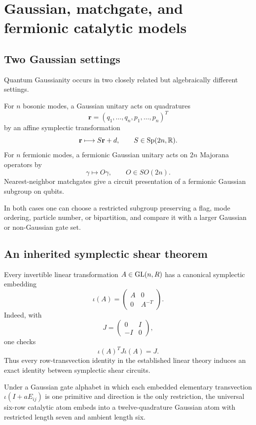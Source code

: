 \chapter{Gaussian, matchgate, and fermionic catalytic models}\label{ch:gaussian}


\section{Two Gaussian settings}
Quantum Gaussianity occurs \cite{WeedbrookEtAl2012} in two closely related but algebraically different settings.

For $n$ bosonic modes, a Gaussian unitary acts on quadratures
\[
\mathbf r=(q_1,\ldots,q_n,p_1,\ldots,p_n)^T
\]
by an affine symplectic transformation
\[
\mathbf r\longmapsto S\mathbf r+d,
\qquad
S\in\operatorname{Sp}(2n,\mathbb R).
\]
For $n$ fermionic modes, a fermionic Gaussian unitary acts on $2n$ Majorana operators by
\[
\gamma\longmapsto O\gamma,
\qquad O\in SO(2n).
\]
Nearest-neighbor matchgates give a circuit presentation of a fermionic Gaussian subgroup on qubits.

In both cases one can choose a restricted subgroup preserving a flag, mode ordering, particle number, or bipartition, and compare it with a larger Gaussian or non-Gaussian gate set.

\section{An inherited symplectic shear theorem}
Every invertible linear transformation $A\in\operatorname{GL}(n,R)$ has a canonical symplectic embedding
\begin{equation}\label{eq:symplectic-embedding}
\iota(A)=
\begin{pmatrix}
A&0\\
0&A^{-T}
\end{pmatrix}.
\end{equation}
Indeed, with
\[
J=
\begin{pmatrix}0&I\\-I&0\end{pmatrix},
\]
one checks
\[
\iota(A)^T J\iota(A)=J.
\]
Thus every row-transvection identity in the established linear theory induces an exact identity between symplectic shear circuits.

\begin{provedbox}
Under a Gaussian gate alphabet in which each embedded elementary transvection $\iota(I+aE_{ij})$ is one primitive and direction is the only restriction, the universal six-row catalytic atom embeds into a twelve-quadrature Gaussian atom with restricted length seven and ambient length six.
\end{provedbox}

